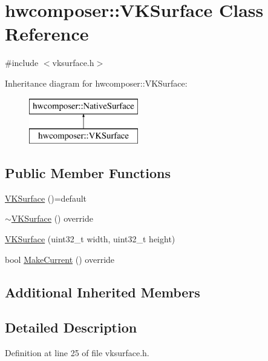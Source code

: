 \hypertarget{classhwcomposer_1_1VKSurface}{}\section{hwcomposer\+:\+:V\+K\+Surface Class Reference}
\label{classhwcomposer_1_1VKSurface}


{\ttfamily \#include $<$vksurface.\+h$>$}

Inheritance diagram for hwcomposer\+:\+:V\+K\+Surface\+:\begin{figure}[H]
\begin{center}
\leavevmode
\includegraphics[height=2.000000cm]{classhwcomposer_1_1VKSurface}
\end{center}
\end{figure}
\subsection*{Public Member Functions}
\begin{DoxyCompactItemize}
\item 
\mbox{\hyperlink{classhwcomposer_1_1VKSurface_a2bb4ff78df502cff6fe5430fe4a8eeb0}{V\+K\+Surface}} ()=default
\item 
\mbox{\hyperlink{classhwcomposer_1_1VKSurface_abf37c906a41c145b0d9685490bdf37df}{$\sim$\+V\+K\+Surface}} () override
\item 
\mbox{\hyperlink{classhwcomposer_1_1VKSurface_addf1196e6a5a52cb9a3bbfbd3ee38610}{V\+K\+Surface}} (uint32\+\_\+t width, uint32\+\_\+t height)
\item 
bool \mbox{\hyperlink{classhwcomposer_1_1VKSurface_a4df93ef0688ea34a96557da2ad411f53}{Make\+Current}} () override
\end{DoxyCompactItemize}
\subsection*{Additional Inherited Members}


\subsection{Detailed Description}


Definition at line 25 of file vksurface.\+h.



